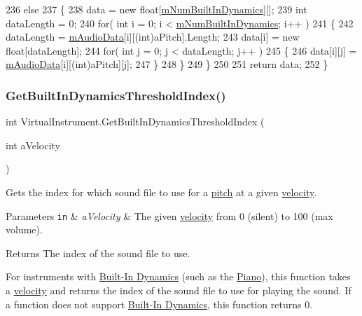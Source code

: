 \begin{DoxyCode}
236         \textcolor{keywordflow}{else}
237         \{
238             data = \textcolor{keyword}{new} \textcolor{keywordtype}{float}[\hyperlink{group___v_i_base_pro_var_gac265f64f759d267ee1e1680f8d387011}{mNumBuiltInDynamics}][];
239             \textcolor{keywordtype}{int} dataLength = 0;
240             \textcolor{keywordflow}{for}( \textcolor{keywordtype}{int} i = 0; i < \hyperlink{group___v_i_base_pro_var_gac265f64f759d267ee1e1680f8d387011}{mNumBuiltInDynamics}; i++ )
241             \{
242                 dataLength = \hyperlink{group___v_i_base_pro_var_ga52e76d9b74408660584676035a92a2c6}{mAudioData}[i][(int)aPitch].Length;
243                 data[i] = \textcolor{keyword}{new} \textcolor{keywordtype}{float}[dataLength];
244                 \textcolor{keywordflow}{for}( \textcolor{keywordtype}{int} j = 0; j < dataLength; j++ )
245                 \{
246                     data[i][j] = \hyperlink{group___v_i_base_pro_var_ga52e76d9b74408660584676035a92a2c6}{mAudioData}[i][(int)aPitch][j];
247                 \}
248             \}
249         \}
250 
251         \textcolor{keywordflow}{return} data;
252     \}
\end{DoxyCode}
\mbox{\label{group___v_i_base_pub_func_gacddf07c08c3a8154a6934be22f539788}} 
\subsubsection{\texorpdfstring{Get\+Built\+In\+Dynamics\+Threshold\+Index()}{GetBuiltInDynamicsThresholdIndex()}}
{\footnotesize\ttfamily int Virtual\+Instrument.\+Get\+Built\+In\+Dynamics\+Threshold\+Index (\begin{DoxyParamCaption}\item[{int}]{a\+Velocity }\end{DoxyParamCaption})}



Gets the index for which sound file to use for a \hyperlink{group___music_enums_ga508f69b199ea518f935486c990edac1d}{pitch} at a given \hyperlink{group___audio_DefVel}{velocity}. 


\begin{DoxyParams}[1]{Parameters}
\mbox{\tt in}  & {\em a\+Velocity} & The given \hyperlink{group___audio_DefVel}{velocity} from 0 (silent) to 100 (max volume). \\
\hline
\end{DoxyParams}
\begin{DoxyReturn}{Returns}
The index of the sound file to use.
\end{DoxyReturn}
For instruments with \hyperlink{group___audio_DefBID}{Built-\/\+In Dynamics} (such as the \hyperlink{class_piano}{Piano}), this function takes a \hyperlink{group___audio_DefVel}{velocity} and returns the index of the sound file to use for playing the sound. If a function does not support \hyperlink{group___audio_DefBID}{Built-\/\+In Dynamics}, this function returns 0.

